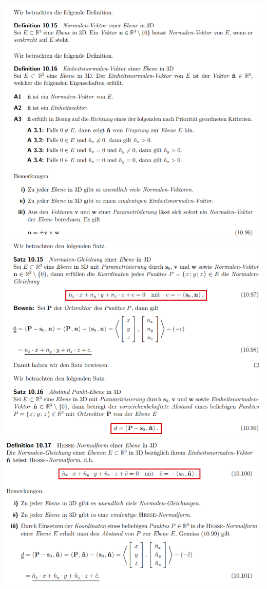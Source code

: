 \includegraphics[width=\columnwidth]{./images/vek31.png}
\includegraphics[width=\columnwidth]{./images/vek32.png}
\includegraphics[width=\columnwidth]{./images/vek33.png}
